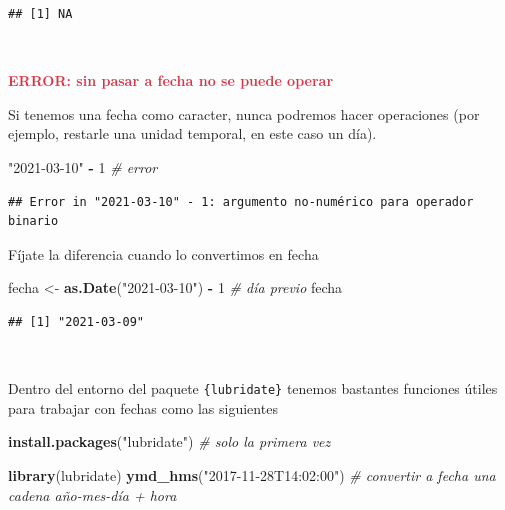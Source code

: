 \documentclass[11pt,]{book}
\newenvironment{Shaded}{\begin{snugshade}}{\end{snugshade}}
\newcommand{\CommentTok}[1]{\textcolor[rgb]{0.37,0.37,0.37}{\textit{#1}}}
\newcommand{\DecValTok}[1]{\textcolor[rgb]{0.06,0.06,0.06}{#1}}
\newcommand{\KeywordTok}[1]{\textcolor[rgb]{0.27,0.27,0.27}{\textbf{#1}}}
\newcommand{\NormalTok}[1]{#1}
\newcommand{\OperatorTok}[1]{\textcolor[rgb]{0.43,0.43,0.43}{\textbf{#1}}}
\newcommand{\StringTok}[1]{\textcolor[rgb]{0.5,0.5,0.5}{#1}}
\begin{document}
\begin{verbatim}
## [1] NA
\end{verbatim}

~

\textbf{\textcolor{#dc3545}{ERROR: sin pasar a fecha no se puede operar}}

Si tenemos una fecha como caracter, nunca podremos hacer operaciones (por ejemplo, restarle una unidad temporal, en este caso un día).

\begin{Shaded}
\begin{Highlighting}[]
\StringTok{"2021-03-10"} \OperatorTok{-}\StringTok{ }\DecValTok{1} \CommentTok{# error}
\end{Highlighting}
\end{Shaded}

\begin{verbatim}
## Error in "2021-03-10" - 1: argumento no-numérico para operador binario
\end{verbatim}

Fíjate la diferencia cuando lo convertimos en fecha

\begin{Shaded}
\begin{Highlighting}[]
\NormalTok{fecha <-}\StringTok{ }\KeywordTok{as.Date}\NormalTok{(}\StringTok{"2021-03-10"}\NormalTok{) }\OperatorTok{-}\StringTok{ }\DecValTok{1} \CommentTok{# día previo}
\NormalTok{fecha}
\end{Highlighting}
\end{Shaded}

\begin{verbatim}
## [1] "2021-03-09"
\end{verbatim}

~

Dentro del entorno del paquete \texttt{\{lubridate\}} tenemos bastantes funciones útiles para trabajar con fechas como las siguientes

\begin{Shaded}
\begin{Highlighting}[]
\KeywordTok{install.packages}\NormalTok{(}\StringTok{"lubridate"}\NormalTok{) }\CommentTok{# solo la primera vez}
\end{Highlighting}
\end{Shaded}

\begin{Shaded}
\begin{Highlighting}[]
\KeywordTok{library}\NormalTok{(lubridate)}
\KeywordTok{ymd_hms}\NormalTok{(}\StringTok{"2017-11-28T14:02:00"}\NormalTok{) }\CommentTok{# convertir a fecha una cadena año-mes-día + hora}
\end{Highlighting}
\end{Shaded}
\end{document}
